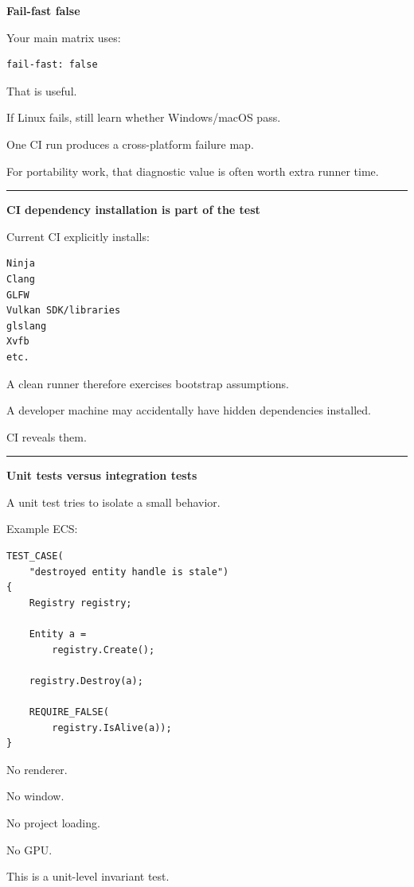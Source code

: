 \textbf{Fail-fast false}

Your main matrix uses:

\begin{verbatim}
fail-fast: false
\end{verbatim}

That is useful.

If Linux fails, still learn whether Windows/macOS pass.

One CI run produces a cross-platform failure map.

For portability work, that diagnostic value is often worth extra runner time.

\begin{center}\rule{0.5\linewidth}{0.5pt}\end{center}

\textbf{CI dependency installation is part of the test}

Current CI explicitly installs:

\begin{verbatim}
Ninja
Clang
GLFW
Vulkan SDK/libraries
glslang
Xvfb
etc.
\end{verbatim}

A clean runner therefore exercises bootstrap assumptions.

A developer machine may accidentally have hidden dependencies installed.

CI reveals them.

\begin{center}\rule{0.5\linewidth}{0.5pt}\end{center}

\textbf{Unit tests versus integration tests}

A unit test tries to isolate a small behavior.

Example ECS:

\begin{verbatim}
TEST_CASE(
    "destroyed entity handle is stale")
{
    Registry registry;

    Entity a =
        registry.Create();

    registry.Destroy(a);

    REQUIRE_FALSE(
        registry.IsAlive(a));
}
\end{verbatim}

No renderer.

No window.

No project loading.

No GPU.

This is a unit-level invariant test.

